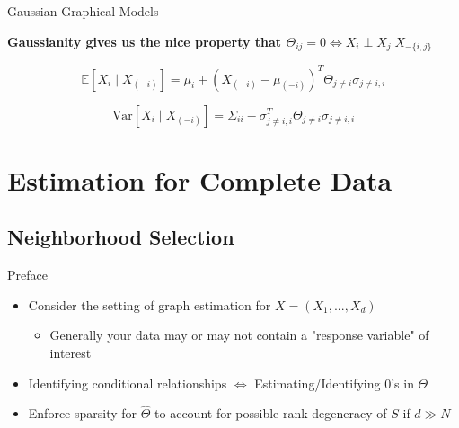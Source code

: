 \documentclass{beamer}
\begin{document}
\begin{frame}{Gaussian Graphical Models}

{\bf Gaussianity gives us the nice property that $\Theta_{ij}=0 \Leftrightarrow X_i \perp X_j | X_{-\{i,j\}}$ }

\[
\mathbb{E}[X_i \mid X_{(-i)}] = \mu_i + (X_{(-i)} - \mu_{(-i)})^T \Theta_{j \neq i} \sigma_{j\neq i, i}
\]

\[
\text{Var}[X_i \mid X_{(-i)}] = \Sigma_{ii} - \sigma_{j \neq i, i}^T \Theta_{j \neq i} \sigma_{j \neq i, i}
\]

\end{frame}



\section{Estimation for Complete Data}

\subsection{Neighborhood Selection}

\begin{frame}{Preface}
    \begin{itemize}\setlength\itemsep{6mm}
        \item Consider the setting of graph estimation for $X = (X_1, ..., X_d)$
        \begin{itemize} \item Generally your data may or may not contain a "response variable" of interest \end{itemize}
        \item Identifying conditional relationships $\Leftrightarrow$ Estimating/Identifying 0's in $\Theta$
        \item Enforce sparsity for $\hat\Theta$ to account for possible rank-degeneracy of $S$ if $d \gg N$
    \end{itemize}
\end{frame}
\end{document}
